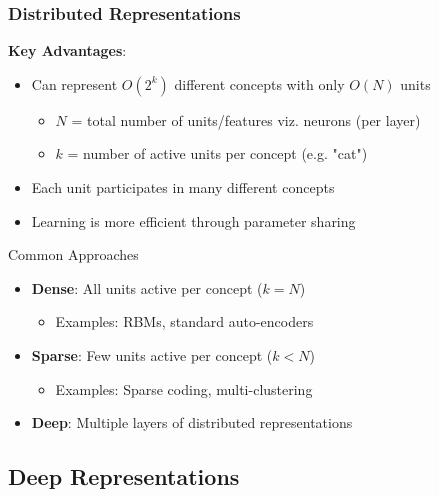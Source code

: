 \documentclass{beamer}
\begin{document}
\begin{frame}
    \frametitle{Distributed Representations}
    \textbf{Key Advantages}:
    \begin{itemize}
    \item Can represent $O(2^k)$ different concepts with only $O(N)$ units
        \begin{itemize}
        \item $N$ = total number of units/features viz. neurons (per layer)
        \item $k$ = number of active units per concept (e.g. "cat")
        \end{itemize}
    \item Each unit participates in many different concepts
    \item Learning is more efficient through parameter sharing
    \end{itemize}
    \pause

    \begin{block}{Common Approaches}
            \begin{itemize}
            \item \textbf{Dense}: All units active per concept ($k = N$)
                \begin{itemize}
                \item Examples: RBMs, standard auto-encoders
                \end{itemize}
            \item \textbf{Sparse}: Few units active per concept ($k < N$)
                \begin{itemize}
                \item Examples: Sparse coding, multi-clustering
                \end{itemize}
            \item \textbf{Deep}: Multiple layers of distributed representations
            \end{itemize}
    \end{block}
\end{frame}
        
\subsection{Deep Representations}
\end{document}
